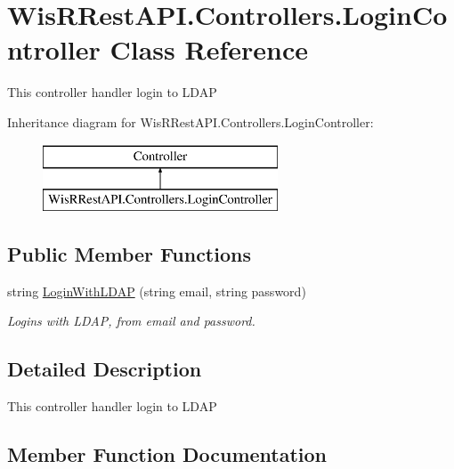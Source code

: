 \hypertarget{class_wis_r_rest_a_p_i_1_1_controllers_1_1_login_controller}{}\section{Wis\+R\+Rest\+A\+P\+I.\+Controllers.\+Login\+Controller Class Reference}
\label{class_wis_r_rest_a_p_i_1_1_controllers_1_1_login_controller}


This controller handler login to L\+D\+A\+P  


Inheritance diagram for Wis\+R\+Rest\+A\+P\+I.\+Controllers.\+Login\+Controller\+:\begin{figure}[H]
\begin{center}
\leavevmode
\includegraphics[height=2.000000cm]{class_wis_r_rest_a_p_i_1_1_controllers_1_1_login_controller}
\end{center}
\end{figure}
\subsection*{Public Member Functions}
\begin{DoxyCompactItemize}
\item 
string \hyperlink{class_wis_r_rest_a_p_i_1_1_controllers_1_1_login_controller_a25116c3838b5f7e18ea11c4146c6b267}{Login\+With\+L\+D\+A\+P} (string email, string password)
\begin{DoxyCompactList}\small\item\em Logins with L\+D\+A\+P, from email and password. \end{DoxyCompactList}\end{DoxyCompactItemize}


\subsection{Detailed Description}
This controller handler login to L\+D\+A\+P 



\subsection{Member Function Documentation}
\hypertarget{class_wis_r_rest_a_p_i_1_1_controllers_1_1_login_controller_a25116c3838b5f7e18ea11c4146c6b267}{}
